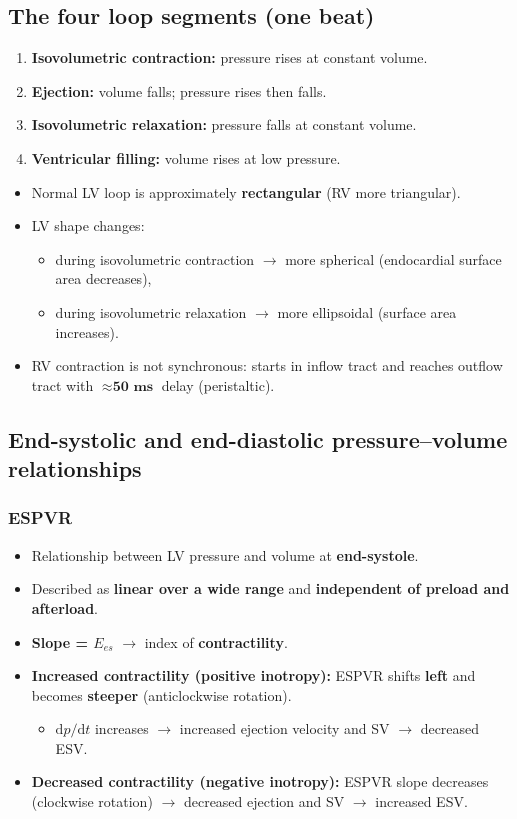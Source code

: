 \documentclass[11pt,a4paper]{article}
\begin{document}
\subsection{The four loop segments (one beat)}
\begin{enumerate}
\item \textbf{Isovolumetric contraction:} pressure rises at constant volume.
\item \textbf{Ejection:} volume falls; pressure rises then falls.
\item \textbf{Isovolumetric relaxation:} pressure falls at constant volume.
\item \textbf{Ventricular filling:} volume rises at low pressure.
\end{enumerate}
\begin{itemize}
\item Normal LV loop is approximately \textbf{rectangular} (RV more triangular).
\item LV shape changes:
  \begin{itemize}
  \item during isovolumetric contraction $\rightarrow$ more spherical (endocardial surface area decreases),
  \item during isovolumetric relaxation $\rightarrow$ more ellipsoidal (surface area increases).
  \end{itemize}
\item RV contraction is not synchronous: starts in inflow tract and reaches outflow tract with $\approx \textbf{50 ms}$ delay (peristaltic).
\end{itemize}

\subsection{End-systolic and end-diastolic pressure--volume relationships}

\subsubsection{ESPVR}
\begin{itemize}
\item Relationship between LV pressure and volume at \textbf{end-systole}.
\item Described as \textbf{linear over a wide range} and \textbf{independent of preload and afterload}.
\item \textbf{Slope = $E_{es}$} $\rightarrow$ index of \textbf{contractility}.
\item \textbf{Increased contractility (positive inotropy):} ESPVR shifts \textbf{left} and becomes \textbf{steeper} (anticlockwise rotation).
  \begin{itemize}
  \item $\mathrm{d}p/\mathrm{d}t$ increases $\rightarrow$ increased ejection velocity and SV $\rightarrow$ decreased ESV.
  \end{itemize}
\item \textbf{Decreased contractility (negative inotropy):} ESPVR slope decreases (clockwise rotation) $\rightarrow$ decreased ejection and SV $\rightarrow$ increased ESV.
\end{itemize}
\end{document}
